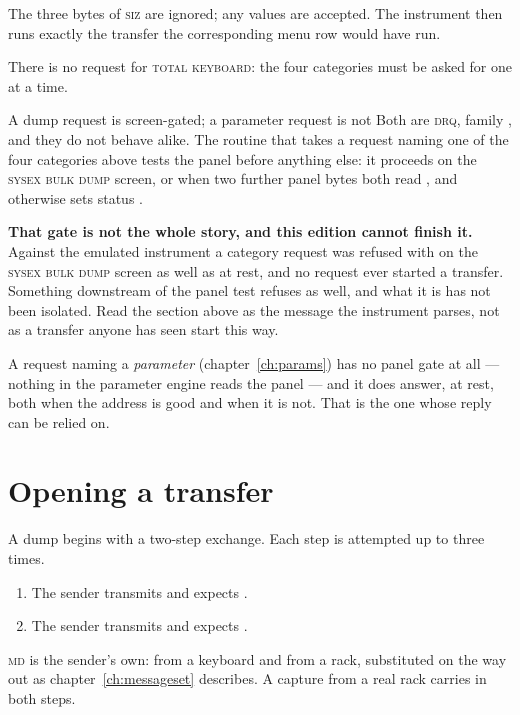The three bytes of \textsc{siz} are ignored; any values are accepted. The
instrument then runs exactly the transfer the corresponding menu row would have run.

There is no request for \textsc{total keyboard}: the four categories must be asked for one
at a time.

\begin{caution}{A dump request is screen-gated; a parameter request is not}
Both are \textsc{drq}, family , and they do not behave alike. The routine that
takes a request naming one of the four categories above tests the panel before anything
else: it proceeds on the \textsc{sysex bulk dump} screen, or when two further panel bytes
both read , and otherwise sets status .

\textbf{That gate is not the whole story, and this edition cannot finish it.} Against the
emulated instrument a category request was refused with  on the
\textsc{sysex bulk dump} screen as well as at rest, and no request ever started a
transfer. Something downstream of the panel test refuses as well, and what it is has not
been isolated. Read the section above as the message the instrument parses, not as a
transfer anyone has seen start this way.

A request naming a \emph{parameter} (chapter~\ref{ch:params}) has no panel gate at all
--- nothing in the parameter engine reads the panel --- and it does answer, at rest, both
when the address is good and when it is not. That is the one  whose reply can be
relied on.
\end{caution}

\section{Opening a transfer}
A dump begins with a two-step exchange. Each step is attempted up to three times.

\begin{enumerate}
\item The sender transmits  and expects
  .
\item The sender transmits  and expects
  .
\end{enumerate}

\textsc{md} is the sender's own:  from a keyboard and  from a rack,
substituted on the way out as chapter~\ref{ch:messageset} describes. A capture from a real
rack carries  in both steps.


